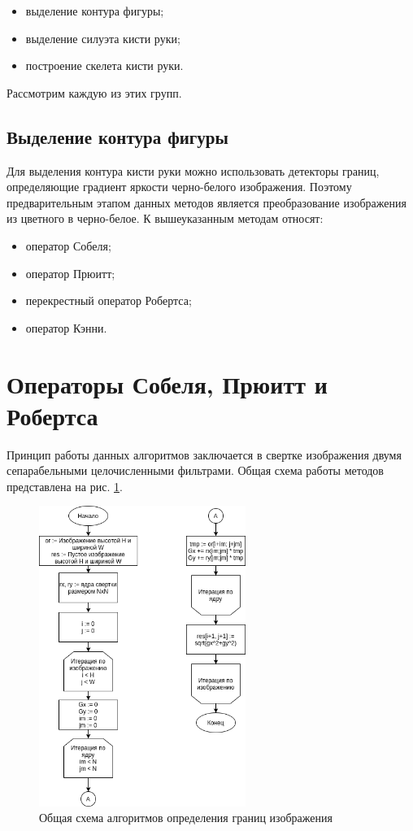 \begin{itemize}
	\item выделение контура фигуры;
	\item выделение силуэта кисти руки;
	\item построение скелета кисти руки.
\end{itemize}

Рассмотрим каждую из этих групп.

\subsection{Выделение контура фигуры}

Для выделения контура кисти руки можно использовать детекторы границ, определяющие градиент яркости черно-белого изображения. Поэтому предварительным этапом данных методов является преобразование изображения из цветного в черно-белое. К вышеуказанным методам относят:

\begin{itemize}
	\item оператор Собеля\cite{Sobel};
	\item оператор Прюитт\cite{Prewitt};
	\item перекрестный оператор Робертса\cite{Roberts};
	\item оператор Кэнни\cite{Canny}.
\end{itemize}

\section*{Операторы Собеля, Прюитт и Робертса}

Принцип работы данных алгоритмов \cite{Sobel,Prewitt,Roberts} заключается в свертке изображения двумя сепарабельными целочисленными фильтрами. Общая схема работы методов представлена на рис. \ref{an:sobel}.

\begin{figure}[!h]
	\centering
	\includegraphics[width=0.6\textwidth]{inc/img/sobel_block}
	\caption{Общая схема алгоритмов определения границ изображения}
	\label{an:sobel}
\end{figure}

